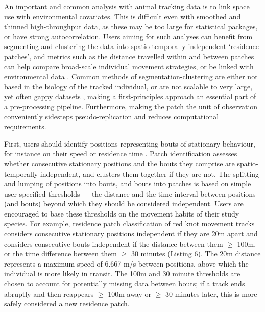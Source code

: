\documentclass[10pt,paper=a4,headings=standardclasses
]{scrartcl}
\begin{document}
An important and common analysis with animal tracking data is to link space use with environmental covariates.
This is difficult even with smoothed and thinned high-throughput data, as these may be too large for statistical packages, or have strong autocorrelation.
Users aiming for such analyses can benefit from segmenting and clustering the data into spatio-temporally independent `residence patches', and metrics such as the distance travelled within and between patches can help compare broad-scale individual movement strategies, or be linked with environmental data \citep{bijleveld2016, oudman2018, barraquand2008}.
Common methods of segmentation-clustering are either not based in the biology of the tracked individual, or are not scalable to very large, yet often gappy datasets \citep{patin2020a}, making a first-principles approach an essential part of a pre-processing pipeline.
Furthermore, making the patch the unit of observation conveniently sidesteps pseudo-replication and reduces computational requirements.

First, users should identify positions representing bouts of stationary behaviour, for instance on their speed or residence time \citep{bracis2018}.
Patch identification assesses whether consecutive stationary positions and the bouts they comprise are spatio-temporally independent, and clusters them together if they are not.
The splitting and lumping of positions into bouts, and bouts into patches is based on simple user-specified thresholds --- the distance and the time interval between positions (and bouts) beyond which they should be considered independent.
Users are encouraged to base these thresholds on the movement habits of their study species.
For example, residence patch classification of red knot movement tracks considers consecutive stationary positions independent if they are 20m apart and considers consecutive bouts independent if the distance between them $\geq$ 100m, or the time difference between them $\geq$ 30 minutes (Listing 6).
The 20m distance represents a maximum speed of 6.667 m/s between positions, above which the individual is more likely in transit.
The 100m and 30 minute thresholds are chosen to account for potentially missing data between bouts; if a track ends abruptly and then reappears $\geq$ 100m away or $\geq$ 30 minutes later, this is more safely considered a new residence patch.
\end{document}
